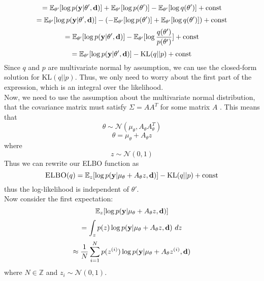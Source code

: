$$ = \mathbb{E}_{\theta'}[\log p(\mathbf{y} | \theta', \mathbf{d})] + \mathbb{E}_{\theta'}[\log p(\theta')] - \mathbb{E}_{\theta'}[\log q(\theta')] + \textrm{const}$$
$$ = \mathbb{E}_{\theta'}[\log p(\mathbf{y} | \theta', \mathbf{d})] - (-\mathbb{E}_{\theta'}[\log p(\theta')] + \mathbb{E}_{\theta'}[\log q(\theta')]) + \textrm{const}$$
$$ = \mathbb{E}_{\theta'}[\log p(\mathbf{y} | \theta', \mathbf{d})] - \mathbb{E}_{\theta'}[\log \frac{q(\theta')}{p(\theta')}] + \textrm{const}$$
$$ = \mathbb{E}_{\theta'}[\log p(\mathbf{y} | \theta', \mathbf{d})] - \textrm{KL}(q || p) + \textrm{const}$$
Since $q$ and $p$ are multivariate normal by assumption, we can use the closed-form solution for $\textrm{KL}(q || p)$. 
Thus, we only need to worry about the first part of the expression, which is an integral over the likelihood.\\
Now, we need to use the assumption about the multivariate normal distribution, that the covariance matrix must satisfy $\Sigma = AA^T$ for some matrix $A$ .
This means that
$$\theta \sim \mathcal{N}(\mu_\theta, A_\theta A_\theta^T)$$
$$\theta = \mu_\theta + A_\theta z$$
where
$$z \sim \mathcal{N}(0, 1)$$
Thus we can rewrite our ELBO function as
$$\textsc{ELBO}(q) = \mathbb{E}_{z}[\log p(\mathbf{y} | \mu_\theta + A_\theta z, \mathbf{d})] - \textrm{KL}(q || p) + \textrm{const}$$
thus the log-likelihood is independent of $\theta'$.\\
Now consider the first expectation:
$$\mathbb{E}_{z}[\log p(\mathbf{y} | \mu_\theta + A_\theta z, \mathbf{d})]$$
$$=\int_{z}p(z) \log p(\mathbf{y} | \mu_\theta + A_\theta z, \mathbf{d})\ dz$$
$$\approx \frac{1}{N}\sum_{i=1}^N p(z^{(i)})\log p(\mathbf{y} | \mu_\theta + A_\theta z^{(i)}, \mathbf{d})$$
where $N \in \mathbb{Z}$ and $z_i \sim \mathcal{N}(0, 1)$.


